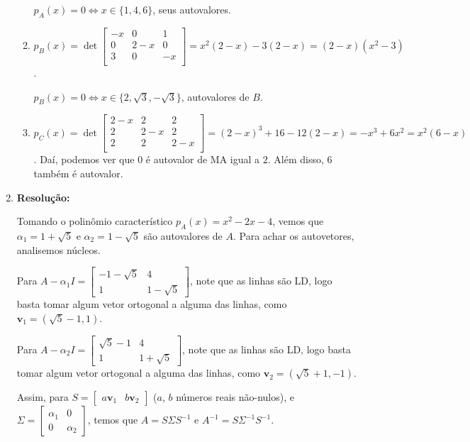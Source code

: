 \documentclass[leqno]{article}
\begin{document}
\begin{enumerate}
\begin{enumerate}
        $p_A(x)=0\iff x \in \{1,4,6\}$, seus autovalores.
        
        \item $p_B(x)=\det \begin{bmatrix}
            -x & 0 & 1\\
            0 & 2-x & 0\\
            3 & 0 & -x\\
        \end{bmatrix}=x^2(2-x)-3(2-x)=(2-x)(x^2-3)$.
        
        $p_B(x)=0\iff x \in \{2,\sqrt{3},-\sqrt{3}\}$, autovalores de $B$.
        
        \item $p_C(x)=\det \begin{bmatrix}
            2-x & 2 & 2\\
            2 & 2-x & 2\\
            2 & 2 & 2-x\\
        \end{bmatrix}=(2-x)^3+16-12(2-x)=-x^3+6x^2=x^2(6-x)$. Daí, podemos ver que $0$ é autovalor de MA igual a $2$. Além disso, $6$ também é autovalor.
    \end{enumerate}
    
    \item 
    
    \textbf{Resolução:}
    
    Tomando o polinômio característico $p_A(x)=x^2-2x-4$, vemos que $\alpha_1=1+\sqrt{5}$ e $\alpha_2=1-\sqrt{5}$ são autovalores de $A$. Para achar os autovetores, analisemos núcleos.
    
    Para $A-\alpha_1I=\begin{bmatrix}-1-\sqrt{5} & 4\\ 1 & 1-\sqrt{5}\end{bmatrix}$, note que as linhas são LD, logo basta tomar algum vetor ortogonal a alguma das linhas, como $\textbf{v}_1=(\sqrt{5}-1,1)$.
    
    Para $A-\alpha_2I=\begin{bmatrix}\sqrt{5}-1 & 4\\ 1 & 1+\sqrt{5}\end{bmatrix}$, note que as linhas são LD, logo basta tomar algum vetor ortogonal a alguma das linhas, como $\textbf{v}_2=(\sqrt{5}+1,-1)$.
    
    Assim, para $S=\begin{bmatrix}a\textbf{v}_1 & b\textbf{v}_2\end{bmatrix}$ ($a$, $b$ números reais não-nulos), e $\Sigma=\begin{bmatrix}\alpha_1 & 0\\
    0 & \alpha_2\end{bmatrix}$, temos que $A=S\Sigma S^{-1}$ e $A^{-1}=S\Sigma^{-1}S^{-1}$.
    

\end{enumerate}
\end{document}
